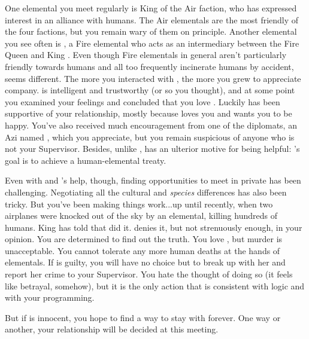 \documentclass[char]{elementals}
\begin{document}
One elemental you meet regularly is King \cKing{\intro} of the Air faction, who has expressed interest in an alliance with humans.  The Air elementals are the most friendly of the four factions, but you remain wary of them on principle.  Another elemental you see often is \cJuliet{\intro}, a Fire elemental who acts as an intermediary between the Fire Queen \cQueen{\intro} and King \cKing{}.  Even though Fire elementals in general aren't particularly friendly towards humans and all too frequently incinerate humans by accident, \cJuliet{} seems different.  The more you interacted with \cJuliet{\them}, the more you grew to appreciate \cJuliet{\their} company.  \cJuliet{\They} is intelligent and trustworthy (or so you thought), and at some point you examined your feelings and concluded that you love \cJuliet{\them}.  Luckily \cLeader{} has been supportive of your relationship, mostly because \cLeader{\they} loves you and wants you to be happy.  You've also received much encouragement from one of the diplomats, an Azi named \cDiplomat{\intro}, which you appreciate, but you remain suspicious of anyone who is not your Supervisor.  Besides, unlike \cLeader{}, \cDiplomat{\they} has an ulterior motive for being helpful: \cDiplomat{}'s goal is to achieve a human-elemental treaty.

Even with \cLeader{} and \cDiplomat{}'s help, though, finding opportunities to meet \cJuliet{} in private has been challenging.  Negotiating all the cultural and \emph{species} differences has also been tricky.   But you've been making things work...up until recently, when two airplanes were knocked out of the sky by an elemental, killing hundreds of humans.  King \cKing{} has told \cLeader{} that \cJuliet{} did it.  \cJuliet{\They} denies it, but not strenuously enough, in your opinion.  You are determined to find out the truth.  You love \cJuliet{\them}, but murder is unacceptable.  You cannot tolerate any more human deaths at the hands of elementals.  If \cJuliet{\they} is guilty, you will have no choice but to break up with her and report her crime to your Supervisor.  You hate the thought of doing so (it feels like betrayal, somehow), but it is the only action that is consistent with logic and with your programming.

But if \cJuliet{\they} is innocent, you hope to find a way to stay with \cJuliet{\them} forever.  One way or another, your relationship will be decided at this meeting.
\end{document}
